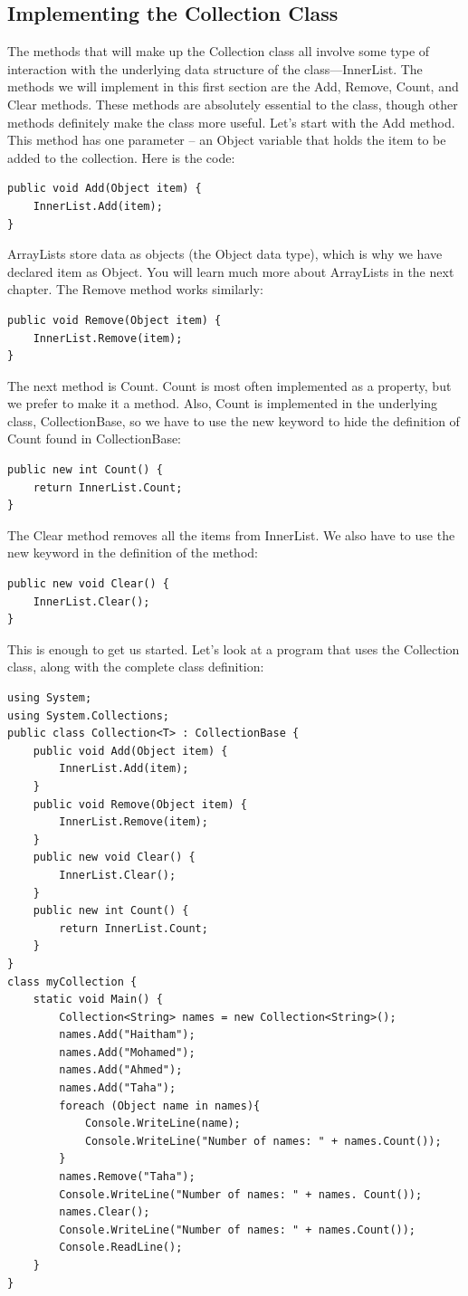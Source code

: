\documentclass[12pt,a4paper,final,twoside,titlepage]{book}
\begin{document}
\subsection{Implementing the Collection Class}
The methods that will make up the Collection class all involve some type of interaction with the underlying data structure of the class—InnerList. The methods we will implement in this first section are the Add, Remove, Count, and Clear methods. These methods are absolutely essential to the class, though other methods definitely make the class more useful.
Let’s start with the Add method. This method has one parameter – an Object variable that holds the item to be added to the collection. Here is the code:
\begin{lstlisting}
public void Add(Object item) { 
	InnerList.Add(item);
}
\end{lstlisting}
ArrayLists store data as objects (the Object data type), which is why we have declared item as Object. You will learn much more about ArrayLists in the next chapter.
The Remove method works similarly:
\begin{lstlisting}
public void Remove(Object item) { 
	InnerList.Remove(item);
}
\end{lstlisting}
The next method is Count. Count is most often implemented as a property, but we prefer to make it a method. Also, Count is implemented in the underlying class, CollectionBase, so we have to use the new keyword to hide the definition of Count found in CollectionBase:
\begin{lstlisting}
public new int Count() { 
	return InnerList.Count;
}
\end{lstlisting}
The Clear method removes all the items from InnerList. We also have to use the new keyword in the definition of the method:
\begin{lstlisting}
public new void Clear() { 
	InnerList.Clear();
}
\end{lstlisting}
This is enough to get us started. Let’s look at a program that uses the Collection class, along with the complete class definition:
\begin{lstlisting}
using System; 
using System.Collections;
public class Collection<T> : CollectionBase { 
	public void Add(Object item) {
		InnerList.Add(item);
	} 
	public void Remove(Object item) {
		InnerList.Remove(item);
	} 
	public new void Clear() {
		InnerList.Clear();
	} 
	public new int Count() {
		return InnerList.Count;
	} 
}
class myCollection {
	static void Main() { 
		Collection<String> names = new Collection<String>(); 
		names.Add("Haitham"); 
		names.Add("Mohamed"); 
		names.Add("Ahmed"); 
		names.Add("Taha"); 
		foreach (Object name in names){
			Console.WriteLine(name); 
			Console.WriteLine("Number of names: " + names.Count()); 
		}		
		names.Remove("Taha");
		Console.WriteLine("Number of names: " + names. Count());
		names.Clear(); 
		Console.WriteLine("Number of names: " + names.Count());
		Console.ReadLine();
	}
}
\end{lstlisting}
\end{document}
